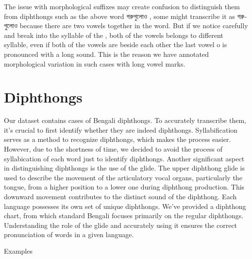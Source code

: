The issue with morphological suffixes may create confusion to distinguish them from diphthongs such as the above word \textbengali{গরুগুলোও} , some might transcribe it as \textbengali{গরুগুলোও}  because there are two vowels together in the word. But if we notice carefully and break into the syllable of the , both of the vowels belongs to different syllable, even if both of the vowels are beside each other the last vowel o is pronounced with a long sound. This is the reason we have annotated morphological variation in such cases with long vowel marks.

\section{Diphthongs}

Our dataset contains cases of Bengali diphthongs. To accurately transcribe them, it's crucial to first identify whether they are indeed diphthongs. Syllabification serves as a method to recognize diphthongs, which makes the process easier. However, due to the shortness of time, we decided to avoid the process of syllabication of each word just to identify diphthongs. Another significant aspect in distinguishing diphthongs is the use of the glide. The upper diphthong glide  is used to describe the movement of the articulatory vocal organs, particularly the tongue, from a higher position to a lower one during diphthong production. This downward movement contributes to the distinct sound of the diphthong. Each language possesses its own set of unique diphthongs. We've provided a diphthong chart, from which standard Bengali focuses primarily on the regular diphthongs. Understanding the role of the glide and accurately using it ensures the correct pronunciation of words in a given language.

Examples

\begin{table}[!ht]
    \centering
    \caption{Phonetic Transcription of Dipthongs}
\end{table}


